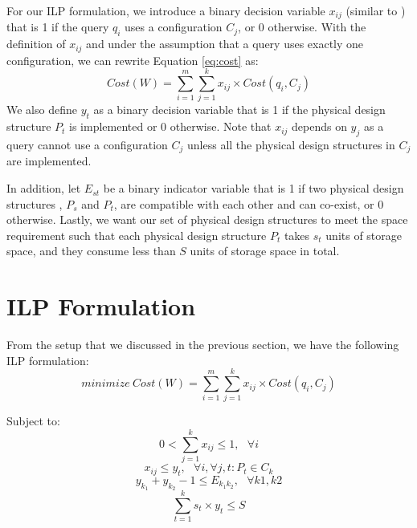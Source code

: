 \documentclass[10pt]{article}
\begin{document}
For our ILP formulation, we introduce a binary decision variable $x_{ij}$ (similar to
\cite{dash2011automated, papadomanolakis2007integer}) that is 1 if the query
$q_i$ uses a configuration $C_j$, or 0 otherwise.
With the definition of $x_{ij}$ and under the assumption that a query uses exactly
one configuration, we can rewrite Equation \eqref{eq:cost} as:
\begin{equation}
  Cost(W) = \sum_{i=1}^{m} \sum_{j=1}^{k} x_{ij} \times Cost(q_i, C_j)
\end{equation}
We also define $y_t$ as a binary decision variable that is 1
if the physical design structure $P_t$ is implemented or 0 otherwise.
Note that $x_{ij}$ depends on $y_j$ as a query cannot use a configuration
$C_j$ unless all the physical design structures in $C_j$ are implemented.

In addition, let $E_{st}$ be a binary indicator variable that is 1 if two physical design structures
, $P_s$ and $P_t$, are compatible with each other and can co-exist, or 0 otherwise.
Lastly, we want our set of physical design structures to meet the space requirement such that
each physical design structure $P_t$ takes $s_t$ units of storage space, and
they consume less than $S$ units of storage space in total.

\section{ILP Formulation}
\label{sec:ILP_formulation}

From the setup that we discussed in the previous section, we have the following ILP formulation:
\begin{equation}
  minimize\ Cost(W) = \sum_{i=1}^{m} \sum_{j=1}^{k} x_{ij} \times Cost(q_i, C_j)
  \label{eq:obj}
\end{equation}

Subject to:
\begin{equation}
  0 < \sum_{j=1}^{k} x_{ij} \leq 1,~~~\forall{i}
  \label{eq:const1}
\end{equation}
\begin{equation}
  x_{ij} \leq  y_{t},~~~\forall{i}, \forall{j,t} : P_t \in C_k
  \label{eq:const2}
\end{equation}
\begin{equation}
  y_{k_1} + y_{k_2} - 1 \leq E_{k_1 k_2},~~~\forall{k1, k2}
  \label{eq:const3}
\end{equation}
\begin{equation}
  \sum_{t=1}^{k} s_t \times y_t \leq S
  \label{eq:const4}
\end{equation}
\end{document}
